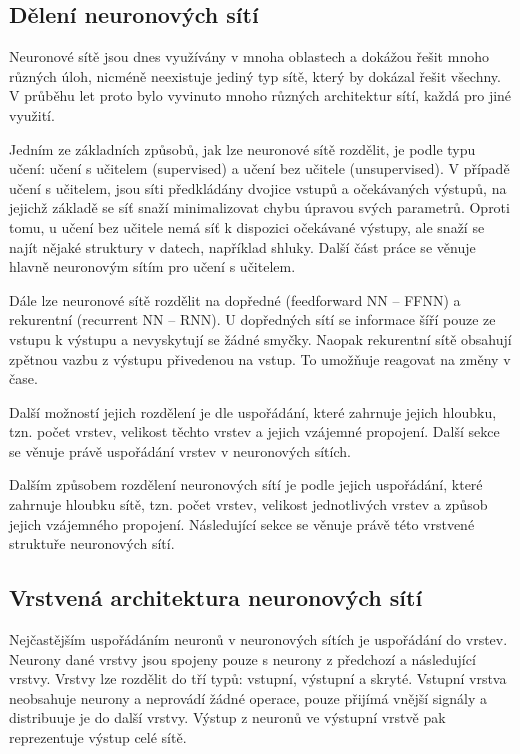 
\subsection{Dělení neuronových sítí}

Neuronové sítě jsou dnes využívány v mnoha oblastech a dokážou řešit mnoho
různých úloh, nicméně neexistuje jediný typ sítě, který by dokázal řešit
všechny. V průběhu let proto bylo vyvinuto mnoho různých architektur sítí,
každá pro jiné využití.

Jedním ze základních způsobů, jak lze neuronové sítě rozdělit, je podle typu
učení: učení s učitelem (supervised) a učení bez učitele (unsupervised). V
případě učení s učitelem, jsou síti předkládány dvojice vstupů a očekávaných
výstupů, na jejichž základě se síť snaží minimalizovat chybu úpravou svých
parametrů. Oproti tomu, u učení bez učitele nemá síť k dispozici očekávané
výstupy, ale snaží se najít nějaké struktury v datech, například shluky. Další
část práce se věnuje hlavně neuronovým sítím pro učení s učitelem.

Dále lze neuronové sítě rozdělit na dopředné (feedforward NN – FFNN) a
rekurentní (recurrent NN – RNN). U dopředných sítí se informace šíří pouze ze
vstupu k výstupu a nevyskytují se žádné smyčky. Naopak rekurentní sítě obsahují
zpětnou vazbu z výstupu přivedenou na vstup. To umožňuje reagovat na změny v
čase.

Další možností jejich rozdělení je dle uspořádání, které zahrnuje jejich
hloubku, tzn. počet vrstev, velikost těchto vrstev a jejich vzájemné propojení.
Další sekce se věnuje právě uspořádání vrstev v neuronových sítích.

Dalším způsobem rozdělení neuronových sítí je podle jejich uspořádání, které
zahrnuje hloubku sítě, tzn. počet vrstev, velikost jednotlivých vrstev a způsob
jejich vzájemného propojení. Následující sekce se věnuje právě této vrstvené
struktuře neuronových sítí.

\subsection{Vrstvená architektura neuronových sítí}
Nejčastějším uspořádáním neuronů v neuronových sítích je uspořádání do vrstev.
Neurony dané vrstvy jsou spojeny pouze s neurony z předchozí a následující
vrstvy. Vrstvy lze rozdělit do tří typů: vstupní, výstupní a skryté. Vstupní
vrstva neobsahuje neurony a neprovádí žádné operace, pouze přijímá vnější
signály a distribuuje je do další vrstvy. Výstup z neuronů ve výstupní vrstvě
pak reprezentuje výstup celé sítě.

